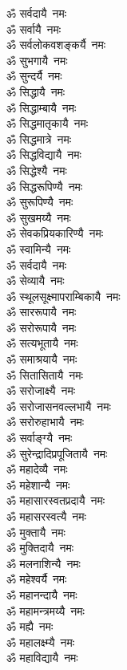 \begin{flushleft}
\begin{multicols}{2}
ॐ सर्वदायै~नमः\hfill{}\\
ॐ सर्वायै~नमः\\
ॐ सर्वलोकवशङ्कर्यै~नमः\\
ॐ सुभगायै~नमः\\
ॐ सुन्दर्यै~नमः\\
ॐ सिद्धायै~नमः\\
ॐ सिद्धाम्बायै~नमः\\
ॐ सिद्धमातृकायै~नमः\\
ॐ सिद्धमात्रे~नमः\\
ॐ सिद्धविद्यायै~नमः\\
ॐ सिद्धेश्यै~नमः\hfill{}\\
ॐ सिद्धरूपिण्यै~नमः\\
ॐ सुरूपिण्यै~नमः\\
ॐ सुखमय्यै~नमः\\
ॐ सेवकप्रियकारिण्यै~नमः\\
ॐ स्वामिन्यै~नमः\\
ॐ सर्वदायै~नमः\\
ॐ सेव्यायै~नमः\\
ॐ स्थूलसूक्ष्मापराम्बिकायै~नमः\\
ॐ साररूपायै~नमः\\
ॐ सरोरूपायै~नमः\hfill{}\\
ॐ सत्यभूतायै~नमः\\
ॐ समाश्रयायै~नमः\\
ॐ सितासितायै~नमः\\
ॐ सरोजाक्ष्यै~नमः\\
ॐ सरोजासनवल्लभायै~नमः\\
ॐ सरोरुहाभायै~नमः\\
ॐ सर्वाङ्ग्यै~नमः\\
ॐ सुरेन्द्रादिप्रपूजितायै~नमः\\
ॐ महादेव्यै~नमः\\
ॐ महेशान्यै~नमः\hfill{}\\
ॐ महासारस्वतप्रदायै~नमः\\
ॐ महासरस्वत्यै~नमः\\
ॐ मुक्तायै~नमः\\
ॐ मुक्तिदायै~नमः\\
ॐ मलनाशिन्यै~नमः\\
ॐ महेश्वर्यै~नमः\\
ॐ महानन्दायै~नमः\\
ॐ महामन्त्रमय्यै~नमः\\
ॐ मह्यै~नमः\\
ॐ महालक्ष्म्यै~नमः\hfill{}\\
ॐ महाविद्यायै~नमः\\

\end{multicols}
\end{flushleft}

